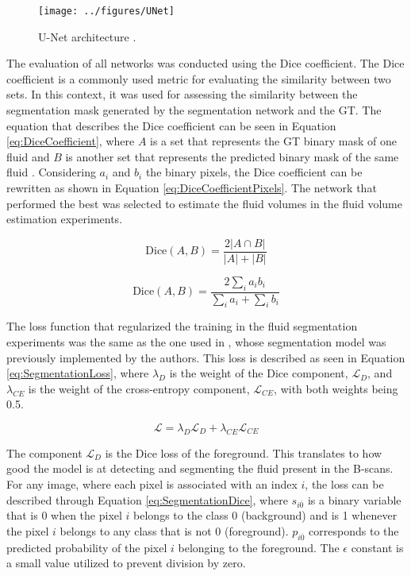 \begin{figure}[!ht]
	\centering
	\texttt{[image: ../figures/UNet]}
	\caption{U-Net architecture \cite{Ronneberger2015}.}
	\label{fig:UNet}
\end{figure}

The evaluation of all networks was conducted using the Dice coefficient. The Dice coefficient is a commonly used metric for evaluating the similarity between two sets. In this context, it was used for assessing the similarity between the segmentation mask generated by the segmentation network and the GT. The equation that describes the Dice coefficient can be seen in Equation \ref{eq:DiceCoefficient}, where $A$ is a set that represents the GT binary mask of one fluid and $B$ is another set that represents the predicted binary mask of the same fluid \cite{Shamir2019}. Considering $a_{i}$ and $b_{i}$ the binary pixels, the Dice coefficient can be rewritten as shown in Equation \ref{eq:DiceCoefficientPixels}. The network that performed the best was selected to estimate the fluid volumes in the fluid volume estimation experiments.

\begin{equation}
	\text{Dice}(A, B) = \frac{2|A \cap B|}{|A| + |B|}
	\label{eq:DiceCoefficient}
\end{equation}

\begin{equation}
	\text{Dice}(A, B) = \frac{2\sum_{i} a_{i} b_{i}}{\sum_{i} a_{i} + \sum_{i} b_{i}}
	\label{eq:DiceCoefficientPixels}
\end{equation}

The loss function that regularized the training in the fluid segmentation experiments was the same as the one used in \textcite{Tennakoon2018}, whose segmentation model was previously implemented by the authors. This loss is described as seen in Equation \ref{eq:SegmentationLoss}, where $\lambda_{D}$ is the weight of the Dice component, $\mathcal{L}_{D}$, and $\lambda_{CE}$ is the weight of the cross-entropy component, $\mathcal{L}_{CE}$, with both weights being 0.5.

\begin{equation}
	\mathcal{L} = \lambda_{D} \mathcal{L}_{D} + \lambda_{CE} \mathcal{L}_{CE}
	\label{eq:SegmentationLoss}
\end{equation}

The component $\mathcal{L}_{D}$ is the Dice loss of the foreground. This translates to how good the model is at detecting and segmenting the fluid present in the B-scans. For any image, where each pixel is associated with an index $i$, the loss can be described through Equation \ref{eq:SegmentationDice}, where $s_{i\overline{0}}$ is a binary variable that is 0 when the pixel $i$ belongs to the class 0 (background) and is 1 whenever the pixel $i$ belongs to any class that is not 0 (foreground). $p_{i\overline{0}}$ corresponds to the predicted probability of the pixel $i$ belonging to the foreground. The $\epsilon$ constant is a small value utilized to prevent division by zero.

